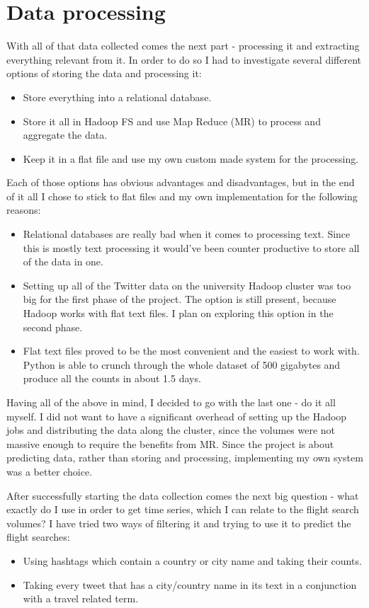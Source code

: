 \documentclass[minf,twoside,singlespacing,parskip,frontabs]{infthesis}
\begin{document}
\section{Data processing}
\label{sec:dp}


With all of that data collected comes the next part - processing it and extracting everything relevant from it. In order to do so I had to investigate several different options of storing the data and processing it:
\begin{itemize}
\item Store everything into a relational database.
\item Store it all in Hadoop FS and use Map Reduce (MR) to process and aggregate the data. 
\item Keep it in a flat file and use my own custom made system for the processing. 
\end{itemize}


Each of those options has obvious advantages and disadvantages, but in the end of it all I chose to stick to flat files and my own implementation for the following reasons:
\begin{itemize}
\item Relational databases are really bad when it comes to processing text. Since this is mostly text processing it would've been counter productive to store all of the data in one. 
\item Setting up all of the Twitter data on the university Hadoop cluster was too big for the first phase of the project. The option is still present, because Hadoop works with flat text files. I plan on exploring this option in the second phase.
\item Flat text files proved to be the most convenient and the easiest to work with. Python is able to crunch through the whole dataset of 500 gigabytes and produce all the counts in about 1.5 days. 
\end{itemize}


Having all of the above in mind, I decided to go with the last one - do it all myself. I did not want to have a significant overhead of setting up the Hadoop jobs and distributing the data along the cluster, since the volumes were not massive enough to require the benefits from MR. Since the project is about predicting data, rather than storing and processing, implementing my own system was a better choice. 


After successfully starting the data collection comes the next big question - what exactly do I use in order to get time series, which I can relate to the flight search volumes? I have tried two ways of filtering it and trying to use it to predict the flight searches:
\begin{itemize}
\item Using hashtags which contain a country or city name and taking their counts.
\item Taking every tweet that has a city/country name in its text in a conjunction with a travel related term.
\end{itemize}
\end{document}

